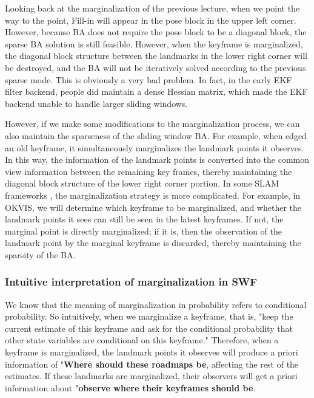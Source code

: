 Looking back at the marginalization of the previous lecture, when we point the way to the point, Fill-in will appear in the pose block in the upper left corner. However, because BA does not require the pose block to be a diagonal block, the sparse BA solution is still feasible. However, when the keyframe is marginalized, the diagonal block structure between the landmarks in the lower right corner will be destroyed, and the BA will not be iteratively solved according to the previous sparse mode. This is obviously a very bad problem. In fact, in the early EKF filter backend, people did maintain a dense Hessian matrix, which made the EKF backend unable to handle larger sliding windows.

However, if we make some modifications to the marginalization process, we can also maintain the sparseness of the sliding window BA. For example, when edged an old keyframe, it simultaneously marginalizes the landmark points it observes. In this way, the information of the landmark points is converted into the common view information between the remaining key frames, thereby maintaining the diagonal block structure of the lower right corner portion. In some SLAM frameworks \textsuperscript{\cite{Leutenegger2015, Engel2016}}, the marginalization strategy is more complicated. For example, in OKVIS, we will determine which keyframe to be marginalized, and whether the landmark points it sees can still be seen in the latest keyframes. If not, the marginal point is directly marginalized; if it is, then the observation of the landmark point by the marginal keyframe is discarded, thereby maintaining the sparsity of the BA.

\subsubsection{Intuitive interpretation of marginalization in SWF}
We know that the meaning of marginalization in probability refers to conditional probability. So intuitively, when we marginalize a keyframe, that is, "keep the current estimate of this keyframe and ask for the conditional probability that other state variables are conditional on this keyframe." Therefore, when a keyframe is marginalized, the landmark points it observes will produce a priori information of "\textbf{Where should these roadmaps be}, affecting the rest of the estimates. If these landmarks are marginalized, their observers will get a priori information about "\textbf{observe where their keyframes should be}.

